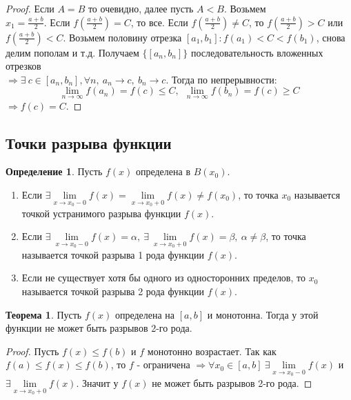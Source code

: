\documentclass[a4paper, 12pt]{article}
\newcommand{\lims}{\lim\limits_{n\to \infty}}
\theoremstyle{definition}
\newtheorem*{definition}{Определение}
\newtheorem*{theorem}{Теорема}
\newtheorem*{example}{Пример}
\begin{document}
        \begin{proof}
            Если $A=B$ то очевидно, далее пусть $A<B$. Возьмем \\
            $x_1=\frac{a+b}{2}$. Если $f(\frac{a+b}{2})=C$, то все. Если $f(\frac{a+b}{2})\ne C$, то $f(\frac{a+b}{2})>C$ или $f(\frac{a+b}{2})<C$. Возьмем половину отрезка $[a_1,b_1]: f(a_1)<C<f(b_1)$, снова делим пополам и т.д. Получаем $\{[a_n,b_n]\}$ последовательность вложенных отрезков\\
            $\Rightarrow \exists\ c\in [a_n,b_n], \forall n,\ a_n\to c,\ b_n\to c$. Тогда по непрерывности:
            \[\lims f(a_n)=f(c)\leq C,\ \ \lims f(b_n)=f(c)\geq C\]
            $\Rightarrow f(c)=C$. 
        \end{proof} 
    \subsection{Точки разрыва функции}
        \begin{definition} 
            Пусть $f(x)$ определена в $B(x_0)$.    
            \begin{enumerate}
                \item Если $\exists \lim\limits_{x\to x_0-0}f(x)=\lim\limits_{x\to x_0+0}f(x)\ne f(x_0)$, то  точка $x_0$ называется точкой устранимого разрыва функции $f(x)$.
                \item Если $\exists\ \lim\limits_{x\to x_0-0}f(x)=\alpha,\ \exists\ \lim\limits_{x\to x_0+0}f(x)=\beta,\ \alpha\ne \beta$, то точка называется точкой разрыва 1 рода функции $f(x)$.
                \item Если не существует хотя бы одного из односторонних пределов, то $x_0$ называется точкой разрыва 2 рода функции $f(x)$.
            \end{enumerate}
        \end{definition} 
        \begin{theorem}
            Пусть $f(x)$ определена на $[a,b]$ и монотонна. Тогда у этой функции не может быть разрывов 2-го рода.
        \end{theorem} 
        \begin{proof}
            Пусть $f(x)\leq f(b)$ и $f$ монотонно возрастает. Так как\\
            $f(a)\leq f(x)\leq f(b)$, то $f$ - ограничена $\Rightarrow \forall x_0\in [a,b]\ \exists \lim\limits_{x\to x_0-0}f(x)$ и $\exists \lim\limits_{x\to x_0+0}f(x)$. Значит у $f(x)$ не может быть разрывов 2-го рода.
        \end{proof}
\end{document}
